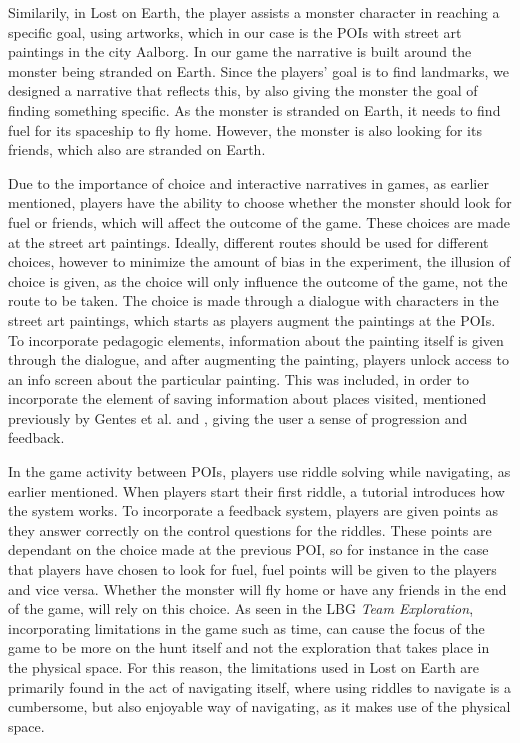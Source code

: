 Similarily, in Lost on Earth, the player assists a monster character in reaching a specific goal, using artworks, which in our case is the POIs with street art paintings in the city Aalborg. In our game the narrative is built around the monster being stranded on Earth. Since the players' goal is to find landmarks, we designed a narrative that reflects this, by also giving the monster the goal of finding something specific. As the monster is stranded on Earth, it needs to find fuel for its spaceship to fly home. However, the monster is also looking for its friends, which also are stranded on Earth.

Due to the importance of choice and interactive narratives in games, as earlier mentioned, players have the ability to choose whether the monster should look for fuel or friends, which will affect the outcome of the game. These choices are made at the street art paintings. Ideally, different routes should be used for different choices, however to minimize the amount of bias in the experiment, the illusion of choice is given, as the choice will only influence the outcome of the game, not the route to be taken. The choice is made through a dialogue with characters in the street art paintings, which starts as players augment the paintings at the POIs. To incorporate pedagogic elements, information about the painting itself is given through the dialogue, and after augmenting the painting, players unlock access to an info screen about the particular painting. This was included, in order to incorporate the element of saving information about places visited, mentioned previously by Gentes et al. \cite{GamingOnTheMove} and \cite{Insectopia}, giving the user a sense of progression and feedback. 


In the game activity between POIs, players use riddle solving while navigating, as earlier mentioned. When players start their first riddle, a tutorial introduces how the system works. To incorporate a feedback system, players are given points as they answer correctly on the control questions for the riddles. These points are dependant on the choice made at the previous POI, so for instance in the case that players have chosen to look for fuel, fuel points will be given to the players and vice versa. Whether the monster will fly home or have any friends in the end of the game, will rely on this choice. As seen in the LBG \textit{Team Exploration}, incorporating limitations in the game such as time, can cause the focus of the game to be more on the hunt itself and not the exploration that takes place in the physical space. For this reason, the limitations used in Lost on Earth are primarily found in the act of navigating itself, where using riddles to navigate is a cumbersome, but also enjoyable way of navigating, as it makes use of the physical space.